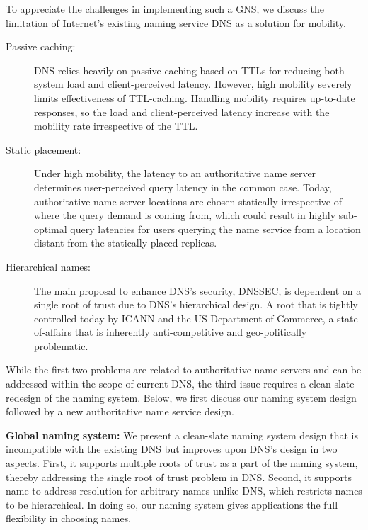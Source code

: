 To appreciate the challenges in implementing such a GNS, we discuss the limitation of Internet's existing naming service DNS as a solution for mobility.
\begin{description}
	\item[Passive caching:] 
	DNS relies heavily on passive caching based on TTLs for reducing both system load and client-perceived latency. However, high mobility severely limits effectiveness of TTL-caching. Handling mobility requires up-to-date responses, so the load and client-perceived latency increase with the mobility rate irrespective of the TTL.
	\item[Static placement:] 
	Under high mobility, the latency to an authoritative name server determines user-perceived query latency in the common case. Today, authoritative name server locations are chosen statically irrespective of where the query demand is coming from, which could result in highly sub-optimal query latencies for users querying the name service from a location distant from the statically placed replicas. 
	\item[Hierarchical names:]
	The main proposal to enhance DNS's security, DNSSEC, is dependent on a single root of trust due to DNS's hierarchical design. A root that is tightly controlled today by ICANN and the US Department of Commerce, a state-of-affairs that is inherently anti-competitive and geo-politically problematic.  
\end{description}

While the first two problems are related to authoritative name servers and can be addressed within the scope of current DNS, the third issue requires a clean slate redesign of the naming system. Below, we first discuss our naming system design followed by a new authoritative name service design.




\textbf{Global naming system:} We present a clean-slate naming system design that is incompatible with the existing DNS but improves upon DNS's design in two aspects. First, it supports multiple roots of trust as a part of the naming system, thereby addressing the single root of trust problem in DNS. Second, it supports name-to-address resolution for arbitrary names unlike DNS, which restricts names to be hierarchical. In doing so, our naming system gives applications the full flexibility in choosing names. 


